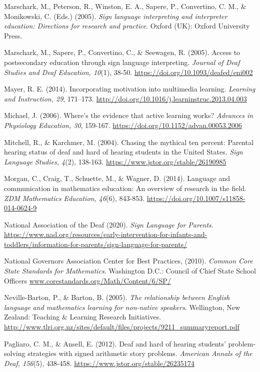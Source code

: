 \documentclass[11.5pt]{sig-alternate} %
\begin{document}
Marschark, M., Peterson, R., Winston, E. A., Sapere, P., Convertino, C. M., \& Monikowski, C. (Eds.) (2005). \textit{Sign language interpreting and interpreter education: Directions for research and practice}. Oxford (UK): Oxford University Press. 

Marschark, M., Sapere, P., Convertino, C., \& Seewagen, R. (2005). Access to postsecondary education through sign language interpreting. \textit{Journal of Deaf Studies and Deaf Education, 10}(1), 38-50. \url{https://doi.org/10.1093/deafed/eni002} 

Mayer, R. E. (2014). Incorporating motivation into multimedia learning. \textit{Learning and Instruction, 29}, 171–173. \url{http://doi.org/10.1016/j.learninstruc.2013.04.003}

Michael, J. (2006). Where's the evidence that active learning works? \textit{Advances in Physiology Education, 30}, 159-167. \url{https://doi.org/10.1152/advan.00053.2006} 

Mitchell, R., \& Karchmer, M. (2004). Chasing the mythical ten percent: Parental hearing status of deaf and hard of hearing students in the United States. \textit{Sign Language Studies, 4}(2), 138-163. \url{https://www.jstor.org/stable/26190985}

Morgan, C., Craig, T., Schuette, M., \& Wagner, D. (2014). Language and communication in mathematics education: An overview of research in the field. \textit{ZDM Mathematics Education, 46}(6), 843-853. \url{https://doi.org/10.1007/s11858-014-0624-9}

National Association of the Deaf (2020). \textit{Sign Language for Parents}. \url{https://www.nad.org/resources/early-intervention-for-infants-and-toddlers/information-for-parents/sign-language-for-parents/}

National Governors Association Center for Best Practices, (2010). \textit{Common Core State Standards for Mathematics}. Washington D.C.: Council of Chief State School Officers \url{www.corestandards.org/Math/Content/6/SP/}	

Neville-Barton, P., \& Barton, B. (2005). \textit{The relationship between English language and mathematics learning for non-native speakers}. Wellington, New Zealand: Teaching \& Learning Research Initiatives. \url{http://www.tlri.org.nz/sites/default/files/projects/9211\_summaryreport.pdf}

Pagliaro, C. M., \& Ansell, E. (2012). Deaf and hard of hearing students’ problem-solving strategies with signed arithmetic story problems. \textit{American Annals of the Deaf, 156}(5), 438-458. \url{https://www.jstor.org/stable/26235174}
\end{document}
